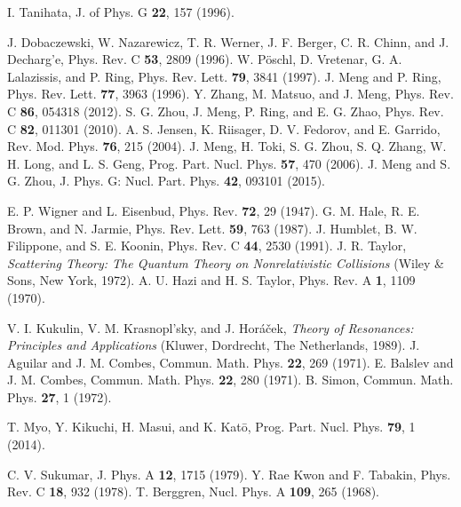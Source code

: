 \documentclass[twocolumn,prc,preprintnumbers,superscriptaddress,floatfix,showpacs]{revtex4}
\begin{document}
\begin{thebibliography}{99}
 I. Tanihata, J. of Phys. G \textbf{22}, 157 (1996).

 J. Dobaczewski, W. Nazarewicz, T. R. Werner, J. F. Berger, C. R. Chinn, and J. Decharg'e, Phys. Rev. C \textbf{53}, 2809 (1996).
 W. P\"{o}schl, D. Vretenar, G. A. Lalazissis, and P. Ring, Phys. Rev. Lett. \textbf{79}, 3841 (1997).
 J. Meng and P. Ring, Phys. Rev. Lett. \textbf{77}, 3963 (1996).
 Y. Zhang, M. Matsuo, and J. Meng, Phys. Rev. C \textbf{86}, 054318 (2012).
 S. G. Zhou, J. Meng, P. Ring, and E. G. Zhao, Phys. Rev. C \textbf{82}, 011301 (2010).
 A. S. Jensen, K. Riisager, D. V. Fedorov, and E. Garrido, Rev. Mod. Phys. \textbf{76}, 215 (2004).
 J. Meng, H. Toki, S. G. Zhou, S. Q. Zhang, W. H. Long, and L. S. Geng, Prog. Part. Nucl. Phys. \textbf{57}, 470 (2006).
 J. Meng and S. G. Zhou, J. Phys. G: Nucl. Part. Phys. \textbf{42}, 093101 (2015).

 E. P. Wigner and L. Eisenbud, Phys. Rev. \textbf{72}, 29 (1947).
 G. M. Hale, R. E. Brown, and N. Jarmie, Phys. Rev. Lett. \textbf{59}, 763 (1987).
 J. Humblet, B. W. Filippone, and S. E. Koonin, Phys. Rev. C \textbf{44}, 2530 (1991).
 J. R. Taylor, \emph{Scattering Theory: The Quantum Theory on Nonrelativistic Collisions} (Wiley \& Sons, New York, 1972).
 A. U. Hazi and H. S. Taylor, Phys. Rev. A \textbf{1}, 1109 (1970). %

 V. I. Kukulin, V. M. Krasnopl'sky, and J. Hor\'{a}\v{c}ek, \emph{Theory of Resonances: Principles and Applications} (Kluwer,
Dordrecht, The Netherlands, 1989).
 J. Aguilar and J. M. Combes, Commun. Math. Phys. \textbf{22}, 269 (1971).
 E. Balslev and J. M. Combes, Commun. Math. Phys. \textbf{22}, 280 (1971).
 B. Simon, Commun. Math. Phys. \textbf{27}, 1 (1972).

 T. Myo, Y. Kikuchi, H. Masui, and K. Kat\={o}, Prog. Part. Nucl. Phys. \textbf{79}, 1 (2014). %

 C. V. Sukumar, J. Phys. A \textbf{12}, 1715 (1979).
 Y. Rae Kwon and F. Tabakin, Phys. Rev. C \textbf{18}, 932 (1978).
 T. Berggren, Nucl. Phys. A \textbf{109}, 265 (1968). %


\end{thebibliography}
\end{document}
